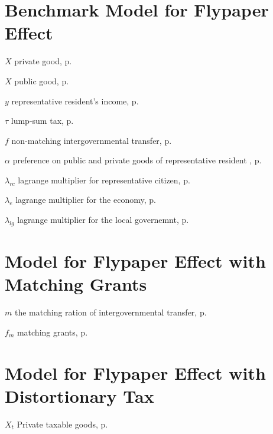 \begin{eqlist}
    \section*{Benchmark Model for Flypaper Effect}

    \item[$X$]
    private good, p.~\pageref{G}

    \item[$X$]
    public good, p.~\pageref{X}

    \item[$y$]
    representative resident's income, p.~\pageref{y}

    \item[$\tau$]
    lump-sum tax, p.~\pageref{y}

    \item[$f$]
    non-matching intergovernmental transfer, p.~\pageref{f}

    \item[$\alpha$]
    preference on public and private goods of representative resident , p.~\pageref{bmrcutility}

    \item[$\lambda_{rc}$]
    lagrange multiplier for representative citizen, p.~\pageref{bmrclagrangian}

    \item[$\lambda_{e}$]
    lagrange multiplier for the economy, p.~\pageref{bmeclagrangian}

    \item[$\lambda_{lg}$]
    lagrange multiplier for the local governemnt, p.~\pageref{bmeclagrangian}

    \section*{ Model for Flypaper Effect with Matching Grants}
    \item[$m$]
    the matching ration of intergovernmental transfer, p.~\pageref{mr}

    \item[$f_m$]
    matching grants, p.~\pageref{mr}

    \section*{ Model for Flypaper Effect with Distortionary Tax}
    \item[$X_{t}$]
    Private taxable goods, p.~\pageref{Xt}


\end{eqlist}
